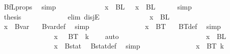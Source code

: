 \begin{isabellebody}
\ BfL{\isacharunderscore}{\kern0pt}props\ \isamarkupfalse%
\ simp\isanewline
\ \ \ \ \ \ \ \ \ \ \isamarkupfalse%
\ \isamarkupfalse%
\ {\isachardoublequoteopen}x\ {\isasymin}\ BL\ {}\ {\isasymor}\ x\ {\isasymin}\ BL\ {}{\isachardoublequoteclose}\ \isamarkupfalse%
\ {\isacharasterisk}{\kern0pt}\ \isamarkupfalse%
\ simp\isanewline
\ \ \ \ \ \ \ \ \ \ \isamarkupfalse%
\ \isamarkupfalse%
\ {\isacharquery}{\kern0pt}thesis\ \isanewline
\ \ \ \ \ \ \ \ \ \ \isamarkupfalse%
\ {\isacharparenleft}{\kern0pt}elim\ disjE{\isacharparenright}{\kern0pt}\isanewline
\ \ \ \ \ \ \ \ \ \ \ \ \isamarkupfalse%
\ {\isachardoublequoteopen}x\ {\isasymin}\ BL\ {}{\isachardoublequoteclose}\isanewline
\ \ \ \ \ \ \ \ \ \ \ \ \isamarkupfalse%
\ \isamarkupfalse%
\ {\isachardoublequoteopen}x\ {\isasymin}\ Bvar\ {}{\isachardoublequoteclose}\ \isamarkupfalse%
\ Bvar{\isacharunderscore}{\kern0pt}def\ \isamarkupfalse%
\ simp\isanewline
\ \ \ \ \ \ \ \ \ \ \ \ \isamarkupfalse%
\ \isamarkupfalse%
\ {\isachardoublequoteopen}x\ {\isasymin}\ BT\ {}{\isachardoublequoteclose}\ \isamarkupfalse%
\ BT{\isacharunderscore}{\kern0pt}def\ \isamarkupfalse%
\ simp\isanewline
\ \ \ \ \ \ \ \ \ \ \ \ \isamarkupfalse%
\ \isamarkupfalse%
\ {\isachardoublequoteopen}x\ {\isasymin}\ {\isasymUnion}\ {\isacharparenleft}{\kern0pt}BT\ {\isacharbackquote}{\kern0pt}\ {\isacharbraceleft}{\kern0pt}{\isachardot}{\kern0pt}{\isachardot}{\kern0pt}k\ {\isacharplus}{\kern0pt}\ {}{\isacharbraceright}{\kern0pt}{\isacharparenright}{\kern0pt}{\isachardoublequoteclose}\ \isamarkupfalse%
\ auto\isanewline
\ \ \ \ \ \ \ \ \ \ \isamarkupfalse%
\isanewline
\ \ \ \ \ \ \ \ \ \ \ \ \isamarkupfalse%
\ {\isachardoublequoteopen}x\ {\isasymin}\ BL\ {}{\isachardoublequoteclose}\isanewline
\ \ \ \ \ \ \ \ \ \ \ \ \isamarkupfalse%
\ \isamarkupfalse%
\ {\isachardoublequoteopen}x\ {\isasymin}\ Bstat{\isachardoublequoteclose}\ \isamarkupfalse%
\ Bstat{\isacharunderscore}{\kern0pt}def\ \isamarkupfalse%
\ simp\isanewline
\ \ \ \ \ \ \ \ \ \ \ \ \isamarkupfalse%
\ \isamarkupfalse%
\ {\isachardoublequoteopen}x\ {\isasymin}\ BT\ {\isacharparenleft}{\kern0pt}k{\isacharplus}{\kern0pt}{}{\isacharparenright}{\kern0pt}{\isachardoublequoteclose}\ \isamarkupfalse%

\end{isabellebody}
